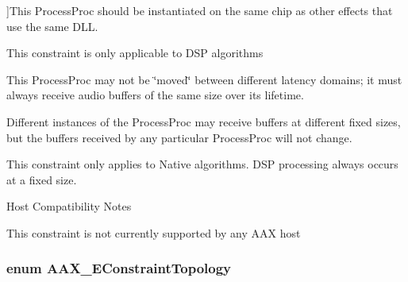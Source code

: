 \begin{Desc}
\begin{description}
{}]This {\ttfamily Process\+Proc} should be instantiated on the same chip as other effects that use the same D\+L\+L. \begin{DoxyItemize}
\item This constraint is only applicable to D\+S\+P algorithms \end{DoxyItemize}
\item[{\em 
\hypertarget{a00206_a0c5d795c1fd021c5b9b541febc34601aa12ffeaf435dc753cbd90adb409b739cd}{}A\+A\+X\+\_\+e\+Constraint\+Location\+Mask\+\_\+\+Fixed\+Latency\+Domain\label{a00206_a0c5d795c1fd021c5b9b541febc34601aa12ffeaf435dc753cbd90adb409b739cd}
}]This {\ttfamily Process\+Proc} may not be \char`\"{}moved\char`\"{} between different latency domains; it must always receive audio buffers of the same size over its lifetime. \begin{DoxyItemize}
\item Different instances of the {\ttfamily Process\+Proc} may receive buffers at different fixed sizes, but the buffers received by any particular {\ttfamily Process\+Proc} will not change. \item This constraint only applies to Native algorithms. D\+S\+P processing always occurs at a fixed size.\end{DoxyItemize}
\begin{DoxyRefDesc}{Host Compatibility Notes}
\item[\hyperlink{a00380__compatibility_notes000044}{Host Compatibility Notes}]This constraint is not currently supported by any A\+A\+X host \end{DoxyRefDesc}
\end{description}
\end{Desc}
\hypertarget{a00206_a714f56a9b0ab98a3a5365760adf77624}{}
\subsubsection[{A\+A\+X\+\_\+\+E\+Constraint\+Topology}]{\setlength{\rightskip}{0pt plus 5cm}enum {\bf A\+A\+X\+\_\+\+E\+Constraint\+Topology}}\label{a00206_a714f56a9b0ab98a3a5365760adf77624}


